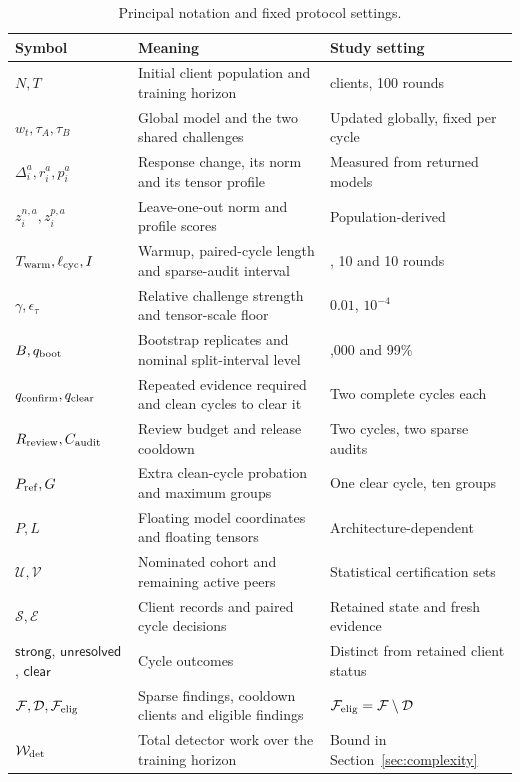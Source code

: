 \documentclass[conference]{IEEEtran}
\begin{document}
\begin{table}[t]\centering\footnotesize
\renewcommand{\arraystretch}{1.05}
\caption{Principal notation and fixed protocol settings.}\label{tab:notation-settings}
\begin{tabular}{>{\raggedright\arraybackslash}p{3.1cm}>{\raggedright\arraybackslash}p{8.0cm}>{\raggedright\arraybackslash}p{4.8cm}}\toprule
Symbol & Meaning & Study setting \\ \midrule
$N,T$ & Initial client population and training horizon & 100 clients, 100 rounds \\
$w_t,\tau_A,\tau_B$ & Global model and the two shared challenges & Updated globally, fixed per cycle \\
$\Delta_i^a,r_i^a,p_i^a$ & Response change, its norm and its tensor profile & Measured from returned models \\
$z_i^{n,a},z_i^{p,a}$ & Leave-one-out norm and profile scores & Population-derived \\
$T_{\rm warm},\ell_{\rm cyc},I$ & Warmup, paired-cycle length and sparse-audit interval & 10, 10 and 10 rounds \\
$\gamma,\epsilon_\tau$ & Relative challenge strength and tensor-scale floor & $0.01$, $10^{-4}$ \\
$B,q_{\rm boot}$ & Bootstrap replicates and nominal split-interval level & 1,000 and 99\% \\
$q_{\rm confirm},q_{\rm clear}$ & Repeated evidence required and clean cycles to clear it & Two complete cycles each \\
$R_{\rm review},C_{\rm audit}$ & Review budget and release cooldown & Two cycles, two sparse audits \\
$P_{\rm ref},G$ & Extra clean-cycle probation and maximum groups & One clear cycle, ten groups \\
$P,L$ & Floating model coordinates and floating tensors & Architecture-dependent \\
$\mathcal U,\mathcal V$ & Nominated cohort and remaining active peers & Statistical certification sets \\
$\mathcal S,\mathcal E$ & Client records and paired cycle decisions & Retained state and fresh evidence \\
$\mathsf{strong}$, $\mathsf{unresolved}$, $\mathsf{clear}$ & Cycle outcomes & Distinct from retained client status \\
$\mathcal F,\mathcal D,\mathcal F_{\rm elig}$ & Sparse findings, cooldown clients and eligible findings & $\mathcal F_{\rm elig}=\mathcal F\setminus\mathcal D$ \\
$\mathcal W_{\rm det}$ & Total detector work over the training horizon & Bound in Section~\ref{sec:complexity} \\
\bottomrule\end{tabular}
\end{table}
\end{document}
